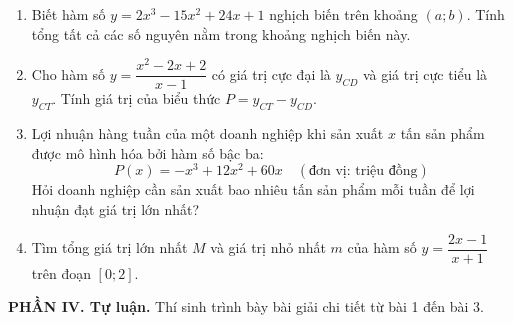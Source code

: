 \documentclass[12pt]{article}
\begin{document}
	\begin{enumerate}[label=\textbf{Câu \arabic*.}, leftmargin=*]
		
		\item Biết hàm số $y = 2x^3 - 15x^2 + 24x + 1$ nghịch biến trên khoảng $(a;b)$. Tính tổng tất cả các số nguyên nằm trong khoảng nghịch biến này.
		
		\item Cho hàm số $y = \dfrac{x^2 - 2x + 2}{x - 1}$ có giá trị cực đại là $y_{CD}$ và giá trị cực tiểu là $y_{CT}$. Tính giá trị của biểu thức $P = y_{CT} - y_{CD}$.
		
		\item Lợi nhuận hàng tuần của một doanh nghiệp khi sản xuất $x$ tấn sản phẩm được mô hình hóa bởi hàm số bậc ba:
		\[ P(x) = -x^3 + 12x^2 + 60x \quad (\text{đơn vị: triệu đồng}) \]
		Hỏi doanh nghiệp cần sản xuất bao nhiêu tấn sản phẩm mỗi tuần để lợi nhuận đạt giá trị lớn nhất?
		
		\item Tìm tổng giá trị lớn nhất $M$ và giá trị nhỏ nhất $m$ của hàm số $y = \dfrac{2x - 1}{x + 1}$ trên đoạn $[0; 2]$.
		
	\end{enumerate}
	
	\vspace{6mm}
	\vspace{4mm}
	\noindent\textbf{PHẦN IV. Tự luận.} Thí sinh trình bày bài giải chi tiết từ bài 1 đến bài 3.
	\vspace{3mm}
	
\end{document}
